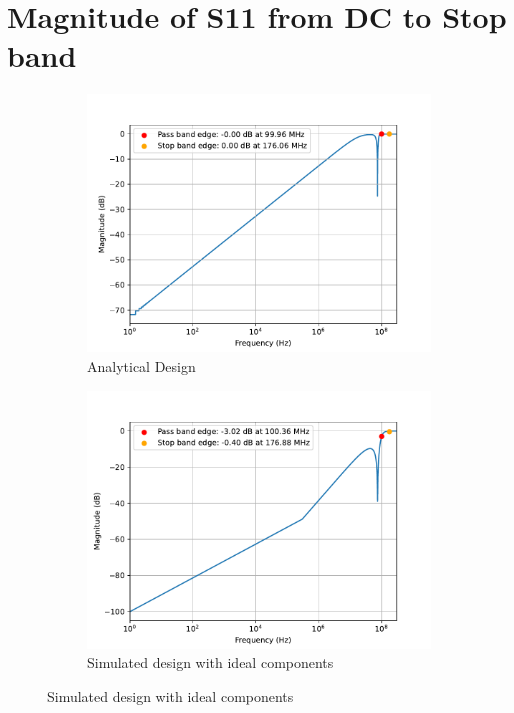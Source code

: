 \documentclass[letterpaper,12pt]{article}
\begin{document}
\newpage
\section{Magnitude of S11 from DC to Stop band\label{sec:s11}}
\begin{figure}[H]
    \begin{subfigure}[t]{.49\textwidth}
      \centering
      \includegraphics[width=\linewidth]{figures/7.analytical}
      \caption{Analytical Design}
    \end{subfigure}
    \hfill
    \begin{subfigure}[t]{.49\textwidth}
      \centering
      \includegraphics[width=\linewidth]{figures/7.ideal}
      \caption{Simulated design with ideal components}
    \end{subfigure}
  

\end{figure}
\end{document}
